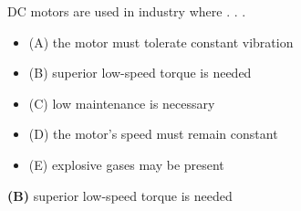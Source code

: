 

DC motors are used in industry where . . .

\begin{itemize}
\item{(A)} the motor must tolerate constant vibration
\vskip 5pt 
\item{(B)} superior low-speed torque is needed
\vskip 5pt 
\item{(C)} low maintenance is necessary
\vskip 5pt 
\item{(D)} the motor's speed must remain constant
\vskip 5pt 
\item{(E)} explosive gases may be present
\end{itemize}







{\bf (B)} superior low-speed torque is needed












